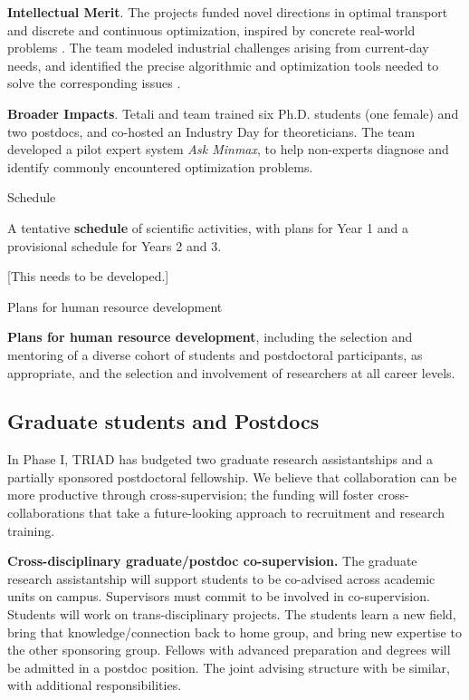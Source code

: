 \documentclass[12pt]{article}
\begin{document}
{\bf Intellectual Merit}.
The projects funded novel directions in optimal transport and discrete and continuous optimization, inspired by concrete real-world problems \cite{gozlan2015characterization, gozlan2014kantorovich}. The team modeled industrial challenges arising from current-day needs, and identified the precise algorithmic and optimization tools needed to solve the corresponding issues \cite{christensen2017approximation}.

{\bf Broader Impacts}.
Tetali and team trained six Ph.D. students (one female) and two postdocs, and co-hosted an Industry Day for theoreticians. The team developed a pilot expert system {\em Ask Minmax}, to help non-experts diagnose and identify commonly encountered optimization problems.


\clearpage


\begin{center}
Schedule
\end{center}


A tentative {\bf schedule} of scientific activities, with plans for Year 1 and a provisional schedule for Years 2 and 3.

[This needs to be developed.]

\clearpage


\begin{center}
Plans for human resource development
\end{center}


{\bf Plans for human resource development}, including the selection and mentoring of a diverse cohort of students and postdoctoral participants, as appropriate, and the selection and involvement of researchers at all career levels.


\subsection{Graduate students and Postdocs}
\label{sec:gra-postdoc}

In Phase I, TRIAD has budgeted two graduate research assistantships and a partially sponsored postdoctoral fellowship.
We believe that collaboration can be more productive through cross-supervision; the funding will foster cross-collaborations that take a future-looking approach to recruitment and research training.

\medskip
\noindent
{\bf Cross-disciplinary graduate/postdoc co-supervision.}
The graduate research assistantship will support students to be co-advised across academic units on campus.
Supervisors must commit to be involved in co-supervision.
Students will work on trans-disciplinary projects.
The students learn a new field, bring that knowledge/connection back to home group, and bring new expertise to the other sponsoring group.
Fellows with advanced preparation and degrees will be admitted in a postdoc position.
The joint advising structure with be similar, with additional responsibilities.
\end{document}
